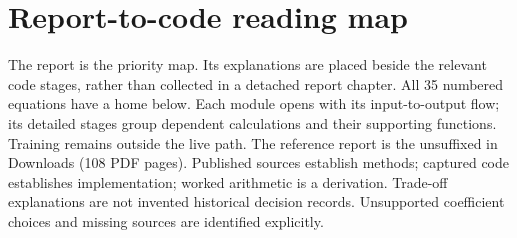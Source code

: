 \chapter{Report-to-code reading map}\label{ch:report-first}
The report is the priority map. Its explanations are placed beside the relevant code stages, rather than collected in a detached report chapter. All 35 numbered equations have a home below. Each module opens with its input-to-output flow; its detailed stages group dependent calculations and their supporting functions. Training remains outside the live path.
The reference report is the unsuffixed  in Downloads (108 PDF pages). Published sources establish methods; captured code establishes implementation; worked arithmetic is a derivation. Trade-off explanations are not invented historical decision records. Unsupported coefficient choices and missing sources are identified explicitly.
